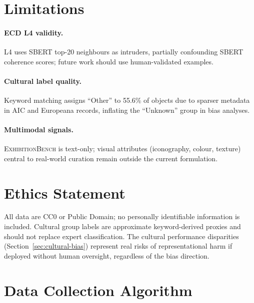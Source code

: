 \documentclass[11pt]{article}
\newcommand{\bench}{\textsc{ExhibitionBench}}
\begin{document}
\section*{Limitations}
\label{sec:limitations}

\paragraph{ECD L4 validity.}
L4 uses SBERT top-20 neighbours as intruders, partially confounding SBERT coherence scores;
future work should use human-validated examples.

\paragraph{Cultural label quality.}
Keyword matching assigns ``Other'' to 55.6\% of objects due to sparser metadata in AIC and Europeana records, inflating the ``Unknown'' group in bias analyses.

\paragraph{Multimodal signals.}
\bench{} is text-only; visual attributes (iconography, colour, texture)
central to real-world curation remain outside the current formulation.

\section*{Ethics Statement}

All data are CC0 or Public Domain; no personally identifiable information is included.
Cultural group labels are approximate keyword-derived proxies
and should not replace expert classification.
The cultural performance disparities (Section~\ref{sec:cultural-bias}) represent real risks
of representational harm if deployed without human oversight, regardless of the bias direction.




\appendix

\section{Data Collection Algorithm}
\label{app:algorithm}
\end{document}
